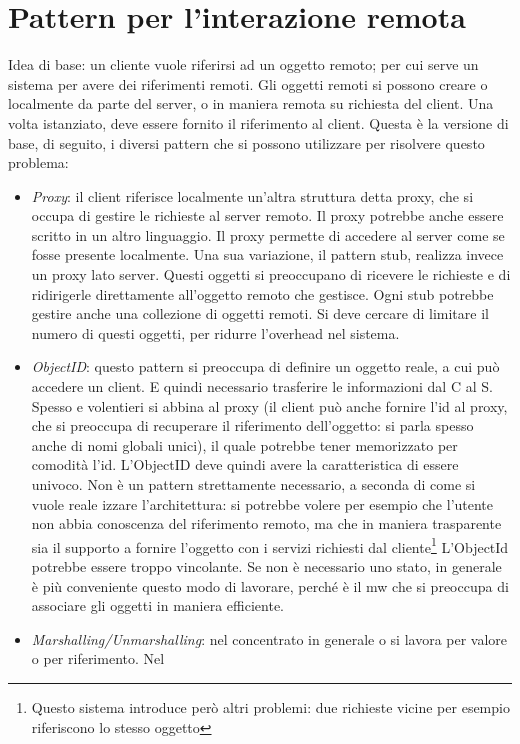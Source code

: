 \section{Pattern per l'interazione remota}
Idea di base: un cliente vuole riferirsi ad un oggetto remoto; per cui serve un sistema per avere dei riferimenti
remoti. Gli oggetti remoti si possono creare o localmente da parte del server, o in maniera remota su richiesta del
client. Una volta istanziato, deve essere fornito il riferimento al client. Questa è la versione di base, di seguito,
i diversi pattern che si possono utilizzare per risolvere questo problema:
\begin{itemize}
 \item \textit{Proxy}: il client riferisce localmente un'altra struttura detta proxy, che si occupa di gestire le
 richieste al server remoto. Il proxy potrebbe anche essere scritto in un altro linguaggio. Il proxy permette di
 accedere al server come se fosse presente localmente.
 Una sua variazione, il pattern stub, realizza invece un proxy lato server.
 Questi oggetti si preoccupano di ricevere le richieste e di ridirigerle direttamente all'oggetto remoto che gestisce.
 Ogni stub potrebbe gestire anche una collezione di oggetti remoti.
 Si deve cercare di limitare il numero di questi oggetti, per ridurre l'overhead nel sistema.
 \item \textit{ObjectID}: questo pattern si preoccupa di definire un oggetto reale, a cui può accedere un client. E
 quindi necessario trasferire le informazioni dal C al S. Spesso e volentieri si abbina al proxy (il client può anche
 fornire l'id al proxy, che si preoccupa di recuperare il riferimento dell'oggetto: si parla spesso anche di nomi
 globali unici), il quale potrebbe tener memorizzato per comodità l'id. L'ObjectID deve quindi avere la caratteristica
 di essere univoco.
 Non è un pattern strettamente necessario, a seconda di come si vuole reale izzare l'architettura: si potrebbe volere
 per esempio che l'utente non abbia conoscenza del riferimento remoto, ma che in maniera trasparente sia il
 supporto a fornire l'oggetto con i servizi richiesti dal cliente\footnote{Questo sistema introduce però altri
 problemi: due richieste vicine per esempio riferiscono lo stesso oggetto} L'ObjectId potrebbe essere troppo
 vincolante. Se non è necessario uno stato, in generale è più conveniente questo modo di lavorare, perché è il mw
 che si preoccupa di associare gli oggetti in maniera efficiente.
 \item \textit{Marshalling/Unmarshalling}: nel concentrato in generale o si lavora per valore o per riferimento. Nel

\end{itemize}
